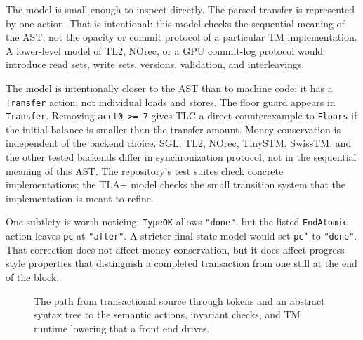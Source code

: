 The model is small enough to inspect directly. The parsed transfer is represented by one action. That is intentional: this model checks the sequential meaning of the AST, not the opacity or commit protocol of a particular TM implementation. A lower-level model of TL2, NOrec, or a GPU commit-log protocol would introduce read sets, write sets, versions, validation, and interleavings.

The model is intentionally closer to the AST than to machine code: it has a \texttt{Transfer} action, not individual loads and stores. The floor guard appears in \texttt{Transfer}. Removing \texttt{acct0 >= 7} gives TLC a direct counterexample to \texttt{Floors} if the initial balance is smaller than the transfer amount. Money conservation is independent of the backend choice. SGL, TL2, NOrec, TinySTM, SwissTM, and the other tested backends differ in synchronization protocol, not in the sequential meaning of this AST. The repository's test suites check concrete implementations; the TLA+ model checks the small transition system that the implementation is meant to refine.

One subtlety is worth noticing: \texttt{TypeOK} allows \texttt{"done"}, but the listed \texttt{EndAtomic} action leaves \texttt{pc} at \texttt{"after"}. A stricter final-state model would set \texttt{pc'} to \texttt{"done"}. That correction does not affect money conservation, but it does affect progress-style properties that distinguish a completed transaction from one still at the end of the block.

\begin{figure}[htbp]
\centering
{}
\caption{The path from transactional source through tokens and an abstract syntax
tree to the semantic actions, invariant checks, and TM runtime lowering that a
front end drives.}
\label{fig:tm-front-end-lowering}
\end{figure}


